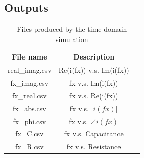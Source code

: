 \subsection{Outputs}


\begin{table}[H]
\begin{center}
\begin{tabular}{ |c|c|c| } 
 \hline
	File name 			& 	Description  \\ 
 \hline
	real\_imag.csv		&	Re(i(fx)) v.s. Im(i(fx))\\ 
	fx\_imag.csv		&	fx v.s. Im(i(fx))\\
	fx\_real.csv 		&	fx v.s. Re(i(fx))\\ 
	fx\_abs.csv 		&	fx v.s. $\lvert i(fx) \rvert$\\ 
	fx\_phi.csv 		&	fx v.s. $ \angle i(fx)$ \\ 
	fx\_C.csv 			&	fx v.s. Capacitance\\ 
	fx\_R.csv 			&	fx v.s. Resistance\\ 
 \hline
\end{tabular}
\caption{Files produced by the time domain simulation}
\label{tab:ce_output}
\end{center}
\end{table}

